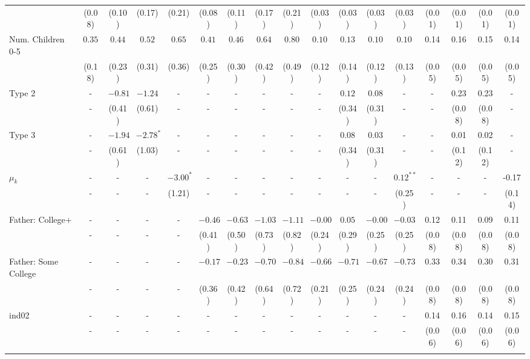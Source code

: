 \begin{tabular}{lcccccccccccccccc}
&(0.08)&(0.10)&(0.17)&(0.21)&(0.08)&(0.11)&(0.17)&(0.21)&(0.03)&(0.03)&(0.03)&(0.03)&(0.01)&(0.01)&(0.01)&(0.01)\\
Num. Children 0-5&$0.35$&$0.44$&$0.52$&$0.65$&$0.41$&$0.46$&$0.64$&$0.80$&$0.10$&$0.13$&$0.10$&$0.10$&0.14&0.16&0.15&0.14\\
&(0.18)&(0.23)&(0.31)&(0.36)&(0.25)&(0.30)&(0.42)&(0.49)&(0.12)&(0.14)&(0.12)&(0.13)&(0.05)&(0.05)&(0.05)&(0.05)\\
Type 2&-&$-0.81$&$-1.24$&-&-&-&-&-&-&$0.12$&$0.08$&-&-&0.23&0.23&-\\
&-&(0.41)&(0.61)&-&-&-&-&-&-&(0.34)&(0.31)&-&-&(0.08)&(0.08)&-\\
Type 3&-&$-1.94$&$-2.78^{*}$&-&-&-&-&-&-&$0.08$&$0.03$&-&-&0.01&0.02&-\\
&-&(0.61)&(1.03)&-&-&-&-&-&-&(0.34)&(0.31)&-&-&(0.12)&(0.12)&-\\
$\mu_{k}$&-&-&-&$-3.00^{*}$&-&-&-&-&-&-&-&$0.12^{**}$&-&-&-&-0.17\\
&-&-&-&(1.21)&-&-&-&-&-&-&-&(0.25)&-&-&-&(0.14)\\
Father: College+&-&-&-&-&$-0.46$&$-0.63$&$-1.03$&$-1.11$&$-0.00$&$0.05$&$-0.00$&$-0.03$&0.12&0.11&0.09&0.11\\
&-&-&-&-&(0.41)&(0.50)&(0.73)&(0.82)&(0.24)&(0.29)&(0.25)&(0.25)&(0.08)&(0.08)&(0.08)&(0.08)\\
Father: Some College&-&-&-&-&$-0.17$&$-0.23$&$-0.70$&$-0.84$&$-0.66$&$-0.71$&$-0.67$&$-0.73$&0.33&0.34&0.30&0.31\\
&-&-&-&-&(0.36)&(0.42)&(0.64)&(0.72)&(0.21)&(0.25)&(0.24)&(0.24)&(0.08)&(0.08)&(0.08)&(0.08)\\
ind02&-&-&-&-&-&-&-&-&-&-&-&-&0.14&0.16&0.14&0.15\\
&-&-&-&-&-&-&-&-&-&-&-&-&(0.06)&(0.06)&(0.06)&(0.06)\\
\\
\bottomrule\end{tabular}